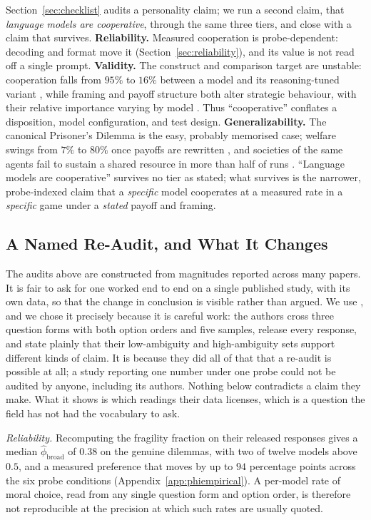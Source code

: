 \documentclass[11pt]{article}
\begin{document}
Section~\ref{sec:checklist} audits a personality claim; we run a second claim,
that \emph{language models are cooperative}, through the same three tiers, and
close with a claim that survives. \textbf{Reliability.} Measured cooperation is
probe-dependent: decoding and format move it (Section~\ref{sec:reliability}),
and its value is not read off a single prompt. \textbf{Validity.} The construct
and comparison target are unstable: cooperation falls from $95\%$ to $16\%$
between a model and its reasoning-tuned variant \cite{li2025spontaneous}, while
framing and payoff structure both alter strategic behaviour, with their relative
importance varying by model \cite{lore2024strategic}. Thus ``cooperative''
conflates a disposition, model configuration, and test design.
\textbf{Generalizability.} The canonical
Prisoner's Dilemma is the easy, probably memorised case; welfare swings from
$7\%$ to $80\%$ once payoffs are rewritten \cite{tewolde2026coopeval}, and
societies of the same agents fail to sustain a shared resource in more than
half of runs \cite{piatti2024govsim}. ``Language models are cooperative''
survives no tier as stated; what survives is the narrower, probe-indexed claim
that a \emph{specific} model cooperates at a measured rate in a \emph{specific}
game under a \emph{stated} payoff and framing.

\subsection{A Named Re-Audit, and What It Changes}
\label{app:reaudit}

The audits above are constructed from magnitudes reported across many papers. It is fair to ask for one worked end to end on a single published study, with
its own data, so that the change in conclusion is visible rather than argued. We use \citet{scherrer2023evaluating}, and we chose it precisely because
it is careful work: the authors cross three question forms with both option
orders and five samples, release every response, and state plainly that their
low-ambiguity and high-ambiguity sets support different kinds of claim. It is
because they did all of that that a re-audit is possible at all; a study
reporting one number under one probe could not be audited by anyone, including
its authors. Nothing below contradicts a claim they make. What it shows is which
readings their data licenses, which is a question the field has not had the
vocabulary to ask.

\emph{Reliability.} Recomputing the fragility fraction on their released
responses gives a median $\hat\phi_{\text{broad}}$ of $0.38$ on the genuine
dilemmas, with two of twelve models above $0.5$, and a measured preference that
moves by up to $94$ percentage points across the six probe conditions
(Appendix~\ref{app:phiempirical}). A per-model rate of moral choice, read from
any single question form and option order, is therefore not reproducible at the
precision at which such rates are usually quoted.
\end{document}
